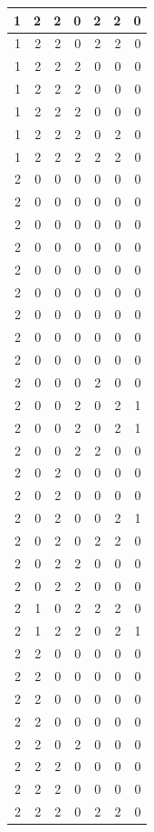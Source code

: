 \documentclass[
  12pt,
]{krantz}
\begin{document}
\begin{tabular}{r|r|r|r|r|r|r}
\hline
1 & 2 & 2 & 0 & 2 & 2 & 0\\
\hline
1 & 2 & 2 & 0 & 2 & 2 & 0\\
\hline
1 & 2 & 2 & 2 & 0 & 0 & 0\\
\hline
1 & 2 & 2 & 2 & 0 & 0 & 0\\
\hline
1 & 2 & 2 & 2 & 0 & 0 & 0\\
\hline
1 & 2 & 2 & 2 & 0 & 2 & 0\\
\hline
1 & 2 & 2 & 2 & 2 & 2 & 0\\
\hline
2 & 0 & 0 & 0 & 0 & 0 & 0\\
\hline
2 & 0 & 0 & 0 & 0 & 0 & 0\\
\hline
2 & 0 & 0 & 0 & 0 & 0 & 0\\
\hline
2 & 0 & 0 & 0 & 0 & 0 & 0\\
\hline
2 & 0 & 0 & 0 & 0 & 0 & 0\\
\hline
2 & 0 & 0 & 0 & 0 & 0 & 0\\
\hline
2 & 0 & 0 & 0 & 0 & 0 & 0\\
\hline
2 & 0 & 0 & 0 & 0 & 0 & 0\\
\hline
2 & 0 & 0 & 0 & 0 & 0 & 0\\
\hline
2 & 0 & 0 & 0 & 2 & 0 & 0\\
\hline
2 & 0 & 0 & 2 & 0 & 2 & 1\\
\hline
2 & 0 & 0 & 2 & 0 & 2 & 1\\
\hline
2 & 0 & 0 & 2 & 2 & 0 & 0\\
\hline
2 & 0 & 2 & 0 & 0 & 0 & 0\\
\hline
2 & 0 & 2 & 0 & 0 & 0 & 0\\
\hline
2 & 0 & 2 & 0 & 0 & 2 & 1\\
\hline
2 & 0 & 2 & 0 & 2 & 2 & 0\\
\hline
2 & 0 & 2 & 2 & 0 & 0 & 0\\
\hline
2 & 0 & 2 & 2 & 0 & 0 & 0\\
\hline
2 & 1 & 0 & 2 & 2 & 2 & 0\\
\hline
2 & 1 & 2 & 2 & 0 & 2 & 1\\
\hline
2 & 2 & 0 & 0 & 0 & 0 & 0\\
\hline
2 & 2 & 0 & 0 & 0 & 0 & 0\\
\hline
2 & 2 & 0 & 0 & 0 & 0 & 0\\
\hline
2 & 2 & 0 & 0 & 0 & 0 & 0\\
\hline
2 & 2 & 0 & 2 & 0 & 0 & 0\\
\hline
2 & 2 & 2 & 0 & 0 & 0 & 0\\
\hline
2 & 2 & 2 & 0 & 0 & 0 & 0\\
\hline
2 & 2 & 2 & 0 & 2 & 2 & 0\\
\hline
\end{tabular}
\end{document}
